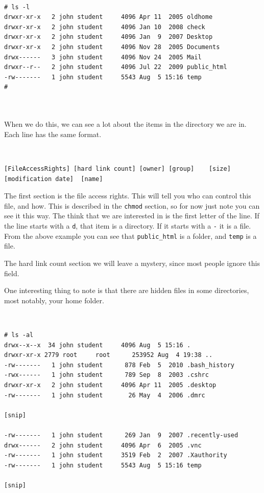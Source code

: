 {\tt 
\begin{verbatim}
# ls -l
drwxr-xr-x   2 john student     4096 Apr 11  2005 oldhome
drwxr-xr-x   2 john student     4096 Jan 10  2008 check
drwxr-xr-x   2 john student     4096 Jan  9  2007 Desktop
drwxr-xr-x   2 john student     4096 Nov 28  2005 Documents
drwx------   3 john student     4096 Nov 24  2005 Mail
drwxr--r--   2 john student     4096 Jul 22  2009 public_html
-rw-------   1 john student     5543 Aug  5 15:16 temp
#



\end{verbatim}
}

When we do this, we can see a lot about the items in the directory we are in. Each line has the same format.
{\tt
\begin{verbatim}
[FileAccessRights] [hard link count] [owner] [group]    [size]  [modification date]  [name]
\end{verbatim}
}

The first section is the file access rights.  This will tell you who can control this file, and how.  This is described in the {\tt chmod} 
section, so for now just note you can see it this way.  The think that we are interested in is 
the first letter of the line.  If the line starts with a {\tt d}, that item is a directory.  If it starts with a {\tt -} it
is a file.  From the above example you can see that {\tt public\_html} is a folder, and {\tt temp} is a file.

The hard link count section we will leave a mystery, since most people ignore this field.

One interesting thing to note is that there are hidden files in some directories, most notably, your home folder.

{\tt
\begin{verbatim}
# ls -al
drwx--x--x  34 john student     4096 Aug  5 15:16 .
drwxr-xr-x 2779 root     root      253952 Aug  4 19:38 ..
-rw-------   1 john student      878 Feb  5  2010 .bash_history
-rwx------   1 john student      789 Sep  8  2003 .cshrc
drwxr-xr-x   2 john student     4096 Apr 11  2005 .desktop
-rw-------   1 john student       26 May  4  2006 .dmrc

[snip]

-rw-------   1 john student      269 Jan  9  2007 .recently-used
drwx------   2 john student     4096 Apr  6  2005 .vnc
-rw-------   1 john student     3519 Feb  2  2007 .Xauthority
-rw-------   1 john student     5543 Aug  5 15:16 temp

[snip]
\end{verbatim}
}

